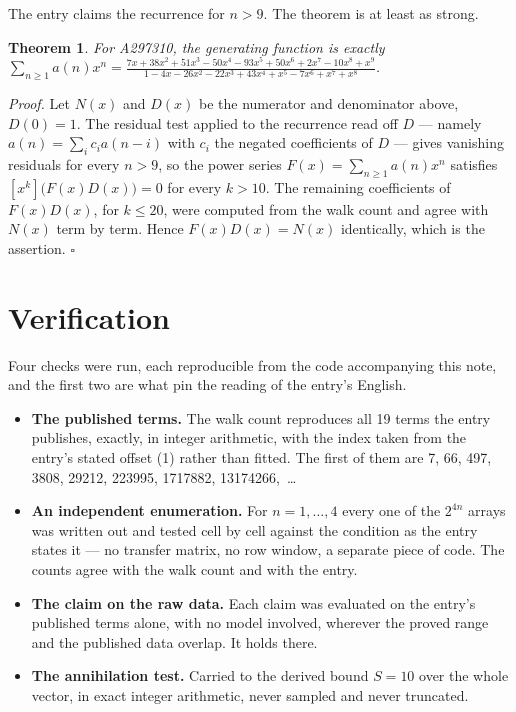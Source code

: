 \documentclass[11pt]{article}
\newtheorem{theorem}{Theorem}
\theoremstyle{definition}
\begin{document}
The entry claims the recurrence for $n > 9$. The theorem is at least as strong.

\begin{theorem} For A297310, the generating function is exactly $\sum_{n\ge 1} a(n)x^n = \frac{7x + 38x^{2} + 51x^{3} - 50x^{4} - 93x^{5} + 50x^{6} + 2x^{7} - 10x^{8} + x^{9}}{1 - 4x - 26x^{2} - 22x^{3} + 43x^{4} + x^{5} - 7x^{6} + x^{7} + x^{8}}$.\end{theorem}

{\itshape Proof.} Let $N(x)$ and $D(x)$ be the numerator and denominator above, $D(0)=1$. The residual test applied to the recurrence read off $D$ --- namely $a(n) = \sum_i c_i a(n-i)$ with $c_i$ the negated coefficients of $D$ --- gives vanishing residuals for every $n > 9$, so the power series $F(x)=\sum_{n\ge 1}a(n)x^n$ satisfies $[x^k]\bigl(F(x)D(x)\bigr) = 0$ for every $k > 10$. The remaining coefficients of $F(x)D(x)$, for $k \le 20$, were computed from the walk count and agree with $N(x)$ term by term. Hence $F(x)D(x) = N(x)$ identically, which is the assertion. $\square$

\section{Verification}

Four checks were run, each reproducible from the code accompanying this note, and the first two are what pin the reading of the entry's English.

\begin{itemize}

\item {\bfseries The published terms.} The walk count reproduces all 19 terms the entry publishes, exactly, in integer arithmetic, with the index taken from the entry's stated offset (1) rather than fitted. The first of them are 7, 66, 497, 3808, 29212, 223995, 1717882, 13174266,~\dots

\item {\bfseries An independent enumeration.} For $n = 1,\dots,4$ every one of the $2^{4n}$ arrays was written out and tested cell by cell against the condition as the entry states it --- no transfer matrix, no row window, a separate piece of code. The counts agree with the walk count and with the entry.

\item {\bfseries The claim on the raw data.} Each claim was evaluated on the entry's published terms alone, with no model involved, wherever the proved range and the published data overlap. It holds there.

\item {\bfseries The annihilation test.} Carried to the derived bound $S = 10$ over the whole vector, in exact integer arithmetic, never sampled and never truncated.

\end{itemize}
\end{document}
